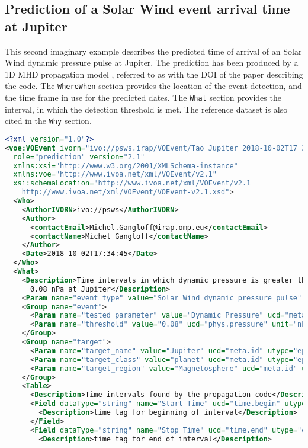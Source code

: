 \documentclass[11pt,a4paper]{ivoa}
\begin{document}
\subsection{Prediction of a Solar Wind event arrival time at Jupiter}
This second imaginary example describes the predicted time of arrival of 
an Solar Wind dynamic pressure pulse at Jupiter. The prediction has been  
produced by a 1D MHD propagation model \cite{tao05}, referred to as with
the DOI of the paper describing the code. The {\tt WhereWhen} section provides
the location of the event detection, and the time frame in use for the 
predicted dates. The {\tt What} section provides the interval, in which the
detection threshold is met. The reference dataset is also cited in the 
{\tt Why} section.
\begin{lstlisting}[language=XML]
<?xml version="1.0"?>
<voe:VOEvent ivorn="ivo://psws.irap/VOEvent/Tao_Jupiter_2018-10-02T17_34_45::v1.0" 
  role="prediction" version="2.1" 
  xmlns:xsi="http://www.w3.org/2001/XMLSchema-instance" 
  xmlns:voe="http://www.ivoa.net/xml/VOEvent/v2.1" 
  xsi:schemaLocation="http://www.ivoa.net/xml/VOEvent/v2.1 
    http://www.ivoa.net/xml/VOEvent/VOEvent-v2.1.xsd"> 
  <Who>
    <AuthorIVORN>ivo://psws</AuthorIVORN>
    <Author>
      <contactEmail>Michel.Gangloff@irap.omp.eu</contactEmail>
      <contactName>Michel Gangloff</contactName>
    </Author>
    <Date>2018-10-02T17:34:45</Date>
  </Who>
  <What>
    <Description>Time intervals in which dynamic pressure is greater than 
      0.08 nPa at Jupiter</Description>
    <Param name="event_type" value="Solar Wind dynamic pressure pulse" ucd="meta.id"/>
    <Group name="event">
      <Param name="tested_parameter" value="Dynamic Pressure" ucd="meta.id" dataType="string"/>
      <Param name="threshold" value="0.08" ucd="phys.pressure" unit="nPa" dataType="string"/>
    </Group>
    <Group name="target">
      <Param name="target_name" value="Jupiter" ucd="meta.id" utype="epn:target_name"/>
      <Param name="target_class" value="planet" ucd="meta.id" utype="epn:target_class"/>
      <Param name="target_region" value="Magnetosphere" ucd="meta.id" utype="epn:target_region"/>
    </Group>
    <Table>
      <Description>Time intervals found by the propagation code</Description>
      <Field dataType="string" name="Start Time" ucd="time.begin" utype="epn:time_min">
        <Description>time tag for beginning of interval</Description>
      </Field>
      <Field dataType="string" name="Stop Time" ucd="time.end" utype="epn:time_max">
        <Description>time tag for end of interval</Description>

\end{lstlisting}
\end{document}
